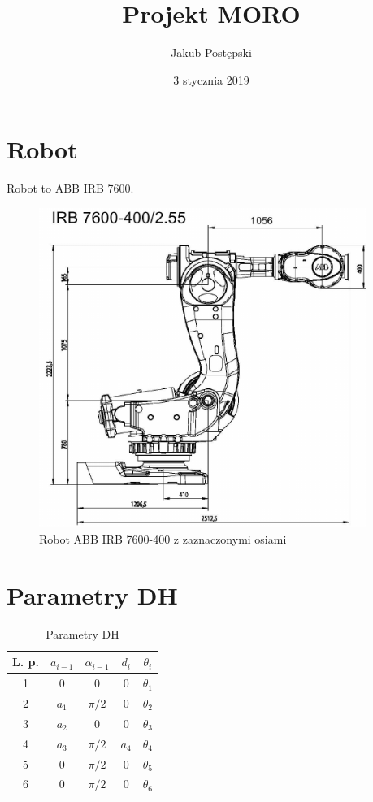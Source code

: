 \documentclass[]{article}
\title{Projekt MORO}
\author{Jakub Postępski}
\date{3 stycznia 2019}
\begin{document}
\maketitle

\section{Robot}
Robot to ABB IRB 7600.

\begin{figure}[H]
	\centering
	\includegraphics[width=0.95\textwidth]{7600.png}
	\caption{Robot ABB IRB 7600-400 z zaznaczonymi osiami}
	\label{img:irb7600}
\end{figure}

\section{Parametry DH}

\begin{table}[H]
	\begin{tabular}{|| c | c c c c ||}
		\hline
		L. p. & $a_{i-1}$ & $\alpha_{i-1}$ & $d_i$ & $\theta_i$ \\ 
		\hline\hline
		1 & $ 0 $ & $0$ & 0 & $\theta_1$ \\
		\hline
		2 & $a_1$ & $\pi/2$ & 0 & $\theta_2$ \\
		\hline
		3 & $a_2$ & $0$ & 0 & $\theta_3$ \\
		\hline
		4 & $a_3$ & $\pi/2$ & $a_4$ & $\theta_4$ \\
		\hline
		5 & $0$ & $\pi/2$ & 0 & $\theta_5$ \\
		\hline
		6 & $0$ & $\pi/2$ & 0 & $\theta_6$ \\
		\hline
		
	\end{tabular}
	\caption{Parametry DH}
	\label{tab1}
\end{table}
\end{document}
